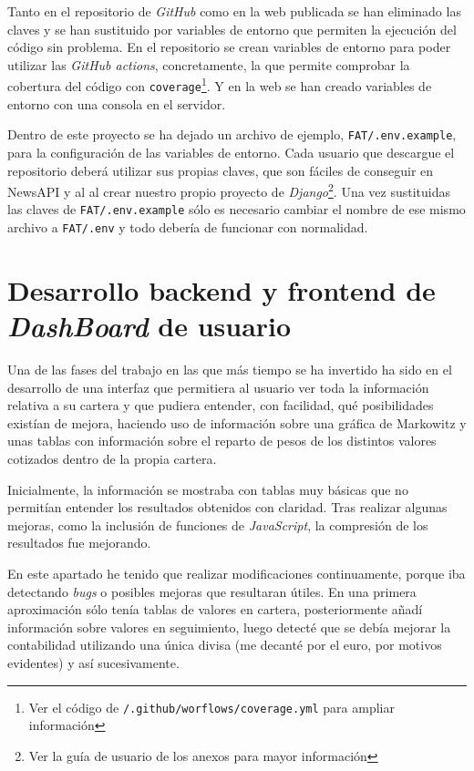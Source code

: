 Tanto en el repositorio de \emph{GitHub} como en la web publicada se han eliminado las claves y se han sustituido por variables de entorno que permiten la ejecución del código sin problema. En el repositorio se crean variables de entorno para poder utilizar las \emph{GitHub actions}, concretamente, la que permite comprobar la cobertura del código con \texttt{coverage}\footnote{Ver el código de \texttt{/.github/worflows/coverage.yml} para ampliar información}. Y en la web se han creado variables de entorno con una consola en el servidor. 

Dentro de este proyecto se ha dejado un archivo de ejemplo, \texttt{FAT/.env.example}, para la configuración de las variables de entorno. Cada usuario que descargue el repositorio deberá utilizar sus propias claves, que son fáciles de conseguir en NewsAPI y al al crear nuestro propio proyecto de \emph{Django}\footnote{Ver la guía de usuario de los anexos para mayor información}. Una vez sustituidas las claves de \texttt{FAT/.env.example} sólo es necesario cambiar el nombre de ese mismo archivo a \texttt{FAT/.env} y todo debería de funcionar con normalidad. 



\section{Desarrollo backend y frontend de \emph{DashBoard} de usuario}\label{desarrollo_dashboard}

Una de las fases del trabajo en las que más tiempo se ha invertido ha sido en el desarrollo de una interfaz que permitiera al usuario ver toda la información relativa a su cartera y que pudiera entender, con facilidad, qué posibilidades existían de mejora, haciendo uso de información sobre una gráfica de Markowitz y unas tablas con información sobre el reparto de pesos de los distintos valores cotizados dentro de la propia cartera. 

Inicialmente, la información se mostraba con tablas muy básicas que no permitían entender los resultados obtenidos con claridad. Tras realizar algunas mejoras, como la inclusión de funciones de \emph{JavaScript}, la compresión de los resultados fue mejorando. 

En este apartado he tenido que realizar modificaciones continuamente, porque iba detectando \emph{bugs} o posibles mejoras que resultaran útiles. En una primera aproximación sólo tenía tablas de valores en cartera, posteriormente añadí información sobre valores en seguimiento, luego detecté que se debía mejorar la contabilidad utilizando una única divisa (me decanté por el euro, por motivos evidentes) y así sucesivamente. 

